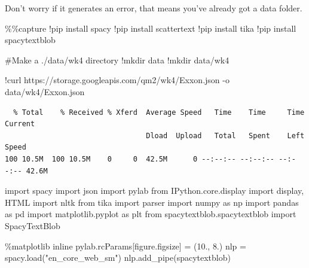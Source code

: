 \documentclass[
  letterpaper,
  DIV=11,
  numbers=noendperiod]{scrreprt}
\newenvironment{Shaded}{\begin{snugshade}}{\end{snugshade}}
\newcommand{\CommentTok}[1]{\textcolor[rgb]{0.37,0.37,0.37}{#1}}
\newcommand{\FloatTok}[1]{\textcolor[rgb]{0.68,0.00,0.00}{#1}}
\newcommand{\ImportTok}[1]{\textcolor[rgb]{0.00,0.46,0.62}{#1}}
\newcommand{\NormalTok}[1]{\textcolor[rgb]{0.00,0.23,0.31}{#1}}
\newcommand{\OperatorTok}[1]{\textcolor[rgb]{0.37,0.37,0.37}{#1}}
\newcommand{\StringTok}[1]{\textcolor[rgb]{0.13,0.47,0.30}{#1}}
\begin{document}
Don't worry if it generates an error, that means you've already got a
data folder.

\begin{Shaded}
\begin{Highlighting}[]
\OperatorTok{\%\%}\NormalTok{capture}
\OperatorTok{!}\NormalTok{pip install spacy}
\OperatorTok{!}\NormalTok{pip install scattertext}
\OperatorTok{!}\NormalTok{pip install tika}
\OperatorTok{!}\NormalTok{pip install spacytextblob}
\end{Highlighting}
\end{Shaded}

\begin{Shaded}
\begin{Highlighting}[]
\CommentTok{\#Make a ./data/wk4 directory}
\OperatorTok{!}\NormalTok{mkdir data}
\OperatorTok{!}\NormalTok{mkdir data}\OperatorTok{/}\NormalTok{wk4}
\end{Highlighting}
\end{Shaded}

\begin{Shaded}
\begin{Highlighting}[]
\OperatorTok{!}\NormalTok{curl https:}\OperatorTok{//}\NormalTok{storage.googleapis.com}\OperatorTok{/}\NormalTok{qm2}\OperatorTok{/}\NormalTok{wk4}\OperatorTok{/}\NormalTok{Exxon.json }\OperatorTok{{-}}\NormalTok{o data}\OperatorTok{/}\NormalTok{wk4}\OperatorTok{/}\NormalTok{Exxon.json}
\end{Highlighting}
\end{Shaded}

\begin{verbatim}
  % Total    % Received % Xferd  Average Speed   Time    Time     Time  Current
                                 Dload  Upload   Total   Spent    Left  Speed
100 10.5M  100 10.5M    0     0  42.5M      0 --:--:-- --:--:-- --:--:-- 42.6M
\end{verbatim}

\begin{Shaded}
\begin{Highlighting}[]
\ImportTok{import}\NormalTok{ spacy}
\ImportTok{import}\NormalTok{ json}
\ImportTok{import}\NormalTok{ pylab}
\ImportTok{from}\NormalTok{ IPython.core.display }\ImportTok{import}\NormalTok{ display, HTML}
\ImportTok{import}\NormalTok{ nltk}
\ImportTok{from}\NormalTok{ tika }\ImportTok{import}\NormalTok{ parser}
\ImportTok{import}\NormalTok{ numpy }\ImportTok{as}\NormalTok{ np}
\ImportTok{import}\NormalTok{ pandas }\ImportTok{as}\NormalTok{ pd}
\ImportTok{import}\NormalTok{ matplotlib.pyplot }\ImportTok{as}\NormalTok{ plt}
\ImportTok{from}\NormalTok{ spacytextblob.spacytextblob }\ImportTok{import}\NormalTok{ SpacyTextBlob}

\OperatorTok{\%}\NormalTok{matplotlib inline}
\NormalTok{pylab.rcParams[}\StringTok{\textquotesingle{}figure.figsize\textquotesingle{}}\NormalTok{] }\OperatorTok{=}\NormalTok{ (}\FloatTok{10.}\NormalTok{, }\FloatTok{8.}\NormalTok{)}
\NormalTok{nlp }\OperatorTok{=}\NormalTok{ spacy.load(}\StringTok{"en\_core\_web\_sm"}\NormalTok{)}
\NormalTok{nlp.add\_pipe(}\StringTok{\textquotesingle{}spacytextblob\textquotesingle{}}\NormalTok{)}
\end{Highlighting}
\end{Shaded}
\end{document}
